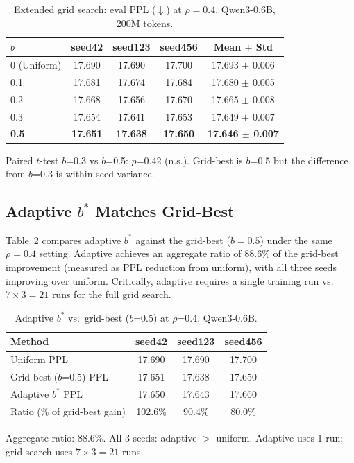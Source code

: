 \documentclass[11pt]{article}
\begin{document}
\begin{table}[t]
\centering
\caption{Extended grid search: eval PPL ($\downarrow$) at $\rho=0.4$, Qwen3-0.6B, 200M tokens.}
\label{tab:grid}
\small
\begin{tabular}{l ccc c}
\toprule
$b$ & seed42 & seed123 & seed456 & Mean $\pm$ Std \\
\midrule
0 (Uniform) & 17.690 & 17.690 & 17.700 & 17.693 $\pm$ 0.006 \\
0.1 & 17.681 & 17.674 & 17.684 & 17.680 $\pm$ 0.005 \\
0.2 & 17.668 & 17.656 & 17.670 & 17.665 $\pm$ 0.008 \\
0.3 & 17.654 & 17.641 & 17.653 & 17.649 $\pm$ 0.007 \\
\textbf{0.5} & \textbf{17.651} & \textbf{17.638} & \textbf{17.650} & \textbf{17.646 $\pm$ 0.007} \\
\bottomrule
\end{tabular}
\vspace{0.3em}

{\footnotesize Paired $t$-test $b$=0.3 vs $b$=0.5: $p$=0.42 (n.s.). Grid-best is $b$=0.5 but the difference from $b$=0.3 is within seed variance.}
\end{table}

\subsection{Adaptive $b^*$ Matches Grid-Best}
\label{sec:adaptive_vs_grid}

Table~\ref{tab:adaptive_main} compares adaptive $b^*$ against the grid-best ($b=0.5$) under the same $\rho=0.4$ setting. Adaptive achieves an aggregate ratio of 88.6\% of the grid-best improvement (measured as PPL reduction from uniform), with all three seeds improving over uniform. Critically, adaptive requires a single training run vs.\ $7 \times 3 = 21$ runs for the full grid search.

\begin{table}[t]
\centering
\caption{Adaptive $b^*$ vs.\ grid-best ($b$=0.5) at $\rho$=0.4, Qwen3-0.6B.}
\label{tab:adaptive_main}
\small
\begin{tabular}{l ccc}
\toprule
Method & seed42 & seed123 & seed456 \\
\midrule
Uniform PPL & 17.690 & 17.690 & 17.700 \\
Grid-best ($b$=0.5) PPL & 17.651 & 17.638 & 17.650 \\
Adaptive $b^*$ PPL & 17.650 & 17.643 & 17.660 \\
\midrule
Ratio (\% of grid-best gain) & 102.6\% & 90.4\% & 80.0\% \\
\bottomrule
\end{tabular}
\vspace{0.3em}

{\footnotesize Aggregate ratio: 88.6\%. All 3 seeds: adaptive $>$ uniform. Adaptive uses 1 run; grid search uses $7 \times 3 = 21$ runs.}
\end{table}
\end{document}
